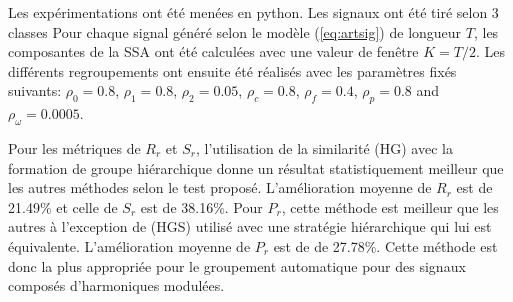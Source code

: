 \documentclass{gretsi}
\begin{document}
Les expérimentations ont été menées en python. Les signaux ont été tiré selon 3 classes Pour chaque signal généré selon le modèle (\ref{eq:artsig}) de longueur $T$, les composantes de la SSA ont été calculées avec une valeur de fenêtre $K=T/2$. Les différents regroupements ont ensuite été réalisés avec les paramètres fixés suivants: $\rho_0=0.8$, $\rho_1=0.8$, $\rho_2=0.05$, $\rho_c=0.8$, $\rho_f=0.4$, $\rho_p=0.8$ and $\rho_\omega=0.0005$.

Pour les métriques de $R_r$ et $S_r$, l'utilisation de la similarité (HG) avec la formation de groupe hiérarchique donne un résultat statistiquement meilleur que les autres méthodes selon le test proposé. L'amélioration moyenne de $R_r$ est de 21.49\% et celle de $S_r$ est de 38.16\%. Pour $P_r$, cette méthode est meilleur que les autres à l'exception de (HGS) utilisé avec une stratégie hiérarchique qui lui est équivalente. L'amélioration moyenne de $P_r$ est de de 27.78\%. 
Cette méthode est donc la plus appropriée pour le groupement automatique pour des signaux composés d'harmoniques modulées.

 
{}
\end{document}
